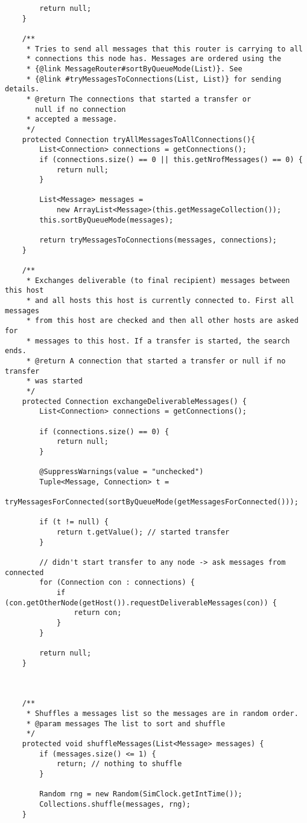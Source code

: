 \documentclass[11pt]{icsthesis}
\begin{document}
\begin{framed}
\begin{verbatim}
		return null;
	}
	
	/**
	 * Tries to send all messages that this router is carrying to all
	 * connections this node has. Messages are ordered using the 
	 * {@link MessageRouter#sortByQueueMode(List)}. See 
	 * {@link #tryMessagesToConnections(List, List)} for sending details.
	 * @return The connections that started a transfer or 
       null if no connection
	 * accepted a message.
	 */
	protected Connection tryAllMessagesToAllConnections(){
		List<Connection> connections = getConnections();
		if (connections.size() == 0 || this.getNrofMessages() == 0) {
			return null;
		}

		List<Message> messages = 
			new ArrayList<Message>(this.getMessageCollection());
		this.sortByQueueMode(messages);

		return tryMessagesToConnections(messages, connections);
	}
		
	/**
	 * Exchanges deliverable (to final recipient) messages between this host
	 * and all hosts this host is currently connected to. First all messages
	 * from this host are checked and then all other hosts are asked for
	 * messages to this host. If a transfer is started, the search ends.
	 * @return A connection that started a transfer or null if no transfer
	 * was started
	 */
	protected Connection exchangeDeliverableMessages() {
		List<Connection> connections = getConnections();

		if (connections.size() == 0) {
			return null;
		}
		
		@SuppressWarnings(value = "unchecked")
		Tuple<Message, Connection> t =
			tryMessagesForConnected(sortByQueueMode(getMessagesForConnected()));

		if (t != null) {
			return t.getValue(); // started transfer
		}
		
		// didn't start transfer to any node -> ask messages from connected
		for (Connection con : connections) {
			if (con.getOtherNode(getHost()).requestDeliverableMessages(con)) {
				return con;
			}
		}
		
		return null;
	}


	
	/**
	 * Shuffles a messages list so the messages are in random order.
	 * @param messages The list to sort and shuffle
	 */
	protected void shuffleMessages(List<Message> messages) {
		if (messages.size() <= 1) {
			return; // nothing to shuffle
		}
		
		Random rng = new Random(SimClock.getIntTime());
		Collections.shuffle(messages, rng);	
	}
	

\end{verbatim}
\end{framed}
\end{document}
